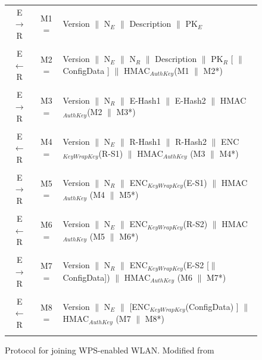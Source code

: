 \documentclass[12pt,a4paper,oneside,pdftex]{report}
\begin{document}
\begin{figure}
\label{tab:wps_full}
\begin{tabular}{c|c p{10cm}}

E $\rightarrow$ R & M1 = & Version $\|$ N$_E$ $\|$ Description $\|$ PK$_E$ 
\\\\

E $\leftarrow$  R & M2 = & Version $\|$ N$_E$ $\|$ N$_R$ $\|$ Description $\|$ PK$_R$ [ $\|$ ConfigData ] $\|$ HMAC$_{AuthKey}$(M1 $\|$ M2*) 
\\\\

E $\rightarrow$ R & M3 = & Version $\|$ N$_R$ $\|$ E-Hash1 $\|$ E-Hash2 $\|$ HMAC$_{AuthKey}$(M2 $\|$ M3*) 
\\\\

E $\leftarrow$  R & M4 = & Version $\|$ N$_E$ $\|$ R-Hash1 $\|$ R-Hash2 $\|$ ENC$_{KeyWrapKey}$(R-S1) $\|$ HMAC$_{AuthKey}$ (M3 $\|$ M4*) 
\\\\

E $\rightarrow$ R & M5 = & Version $\|$ N$_R$ $\|$ ENC$_{KeyWrapKey}$(E-S1) $\|$ HMAC$_{AuthKey}$ (M4 $\|$ M5*) 
\\\\

E $\leftarrow$  R & M6 = & Version $\|$ N$_E$ $\|$ ENC$_{KeyWrapKey}$(R-S2) $\|$ HMAC$_{AuthKey}$ (M5 $\|$ M6*) 
\\\\

E $\rightarrow$ R & M7 = & Version $\|$ N$_R$ $\|$ ENC$_{KeyWrapKey}$(E-S2 [$\|$ConfigData]) $\|$ HMAC$_{AuthKey}$ (M6 $\|$ M7*) 
\\\\

E $\leftarrow$  R & M8 = & Version $\|$ N$_E$ $\|$ [ENC$_{KeyWrapKey}$(ConfigData) ] $\|$ HMAC$_{AuthKey}$ (M7 $\|$ M8*) 
\\\\

\end{tabular}
\caption{Protocol for joining WPS-enabled WLAN. Modified from~\cite{microsoftWCN}}
\end{figure}


\end{document}
